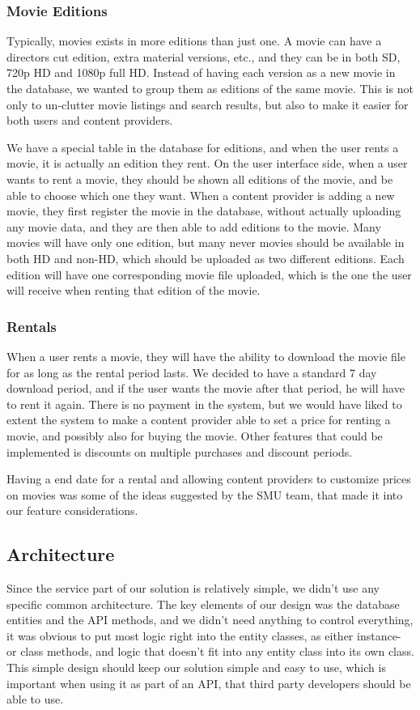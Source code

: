 \subsubsection{Movie Editions}
Typically, movies exists in more editions than just one. A movie can have a directors cut edition, extra material versions, etc., and they can be in both SD, 720p HD and 1080p full HD. Instead of having each version as a new movie in the database, we wanted to group them as editions of the same movie. This is not only to un-clutter movie listings and search results, but also to make it easier for both users and content providers.

We have a special table in the database for editions, and when the user rents a movie, it is actually an edition they rent. On the user interface side, when a user wants to rent a movie, they should be shown all editions of the movie, and be able to choose which one they want. When a content provider is adding a new movie, they first register the movie in the database, without actually uploading any movie data, and they are then able to add editions to the movie. Many movies will have only one edition, but many never movies should be available in both HD and non-HD, which should be uploaded as two different editions. Each edition will have one corresponding movie file uploaded, which is the one the user will receive when renting that edition of the movie.

\subsubsection{Rentals}
When a user rents a movie, they will have the ability to download the movie file for as long as the rental period lasts. We decided to have a standard 7 day download period, and if the user wants the movie after that period, he will have to rent it again. There is no payment in the system, but we would have liked to extent the system to make a content provider able to set a price for renting a movie, and possibly also for buying the movie. Other features that could be implemented is discounts on multiple purchases and discount periods.

Having a end date for a rental and allowing content providers to customize prices on movies was some of the ideas suggested by the SMU team, that made it into our feature considerations. 

\subsection{Architecture}
\label{Design_Service_Architecture}
Since the service part of our solution is relatively simple, we didn't use any specific common architecture. The key elements of our design was the database entities and the API methods, and we didn't need anything to control everything, it was obvious to put most logic right into the entity classes, as either instance- or class methods, and logic that doesn't fit into any entity class into its own class. This simple design should keep our solution simple and easy to use, which is important when using it as part of an API, that third party developers should be able to use.



